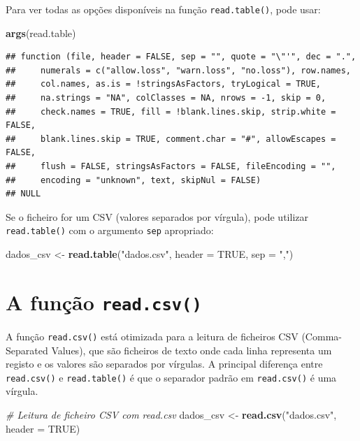 \documentclass[
]{book}
\newenvironment{Shaded}{\begin{snugshade}}{\end{snugshade}}
\newcommand{\AttributeTok}[1]{\textcolor[rgb]{0.13,0.29,0.53}{#1}}
\newcommand{\CommentTok}[1]{\textcolor[rgb]{0.56,0.35,0.01}{\textit{#1}}}
\newcommand{\ConstantTok}[1]{\textcolor[rgb]{0.56,0.35,0.01}{#1}}
\newcommand{\FunctionTok}[1]{\textcolor[rgb]{0.13,0.29,0.53}{\textbf{#1}}}
\newcommand{\NormalTok}[1]{#1}
\newcommand{\OtherTok}[1]{\textcolor[rgb]{0.56,0.35,0.01}{#1}}
\newcommand{\StringTok}[1]{\textcolor[rgb]{0.31,0.60,0.02}{#1}}
\begin{document}
Para ver todas as opções disponíveis na função \texttt{read.table()}, pode
usar:

\begin{Shaded}
\begin{Highlighting}[]
\FunctionTok{args}\NormalTok{(read.table)}
\end{Highlighting}
\end{Shaded}

\begin{verbatim}
## function (file, header = FALSE, sep = "", quote = "\"'", dec = ".", 
##     numerals = c("allow.loss", "warn.loss", "no.loss"), row.names, 
##     col.names, as.is = !stringsAsFactors, tryLogical = TRUE, 
##     na.strings = "NA", colClasses = NA, nrows = -1, skip = 0, 
##     check.names = TRUE, fill = !blank.lines.skip, strip.white = FALSE, 
##     blank.lines.skip = TRUE, comment.char = "#", allowEscapes = FALSE, 
##     flush = FALSE, stringsAsFactors = FALSE, fileEncoding = "", 
##     encoding = "unknown", text, skipNul = FALSE) 
## NULL
\end{verbatim}

Se o ficheiro for um CSV (valores separados por vírgula), pode utilizar
\texttt{read.table()} com o argumento \texttt{sep} apropriado:

\begin{Shaded}
\begin{Highlighting}[]
\NormalTok{dados\_csv }\OtherTok{\textless{}{-}} \FunctionTok{read.table}\NormalTok{(}\StringTok{"dados.csv"}\NormalTok{, }\AttributeTok{header =} \ConstantTok{TRUE}\NormalTok{, }\AttributeTok{sep =} \StringTok{","}\NormalTok{)}
\end{Highlighting}
\end{Shaded}

\section{\texorpdfstring{A função \texttt{read.csv()}}{A função read.csv()}}\label{a-funuxe7uxe3o-read.csv}

A função \texttt{read.csv()} está otimizada para a leitura de ficheiros CSV
(Comma-Separated Values), que são ficheiros de texto onde cada linha
representa um registo e os valores são separados por vírgulas. A
principal diferença entre \texttt{read.csv()} e \texttt{read.table()} é que o
separador padrão em \texttt{read.csv()} é uma vírgula.

\begin{Shaded}
\begin{Highlighting}[]
\CommentTok{\# Leitura de ficheiro CSV com read.csv}
\NormalTok{dados\_csv }\OtherTok{\textless{}{-}} \FunctionTok{read.csv}\NormalTok{(}\StringTok{"dados.csv"}\NormalTok{, }\AttributeTok{header =} \ConstantTok{TRUE}\NormalTok{)}
\end{Highlighting}
\end{Shaded}
\end{document}
